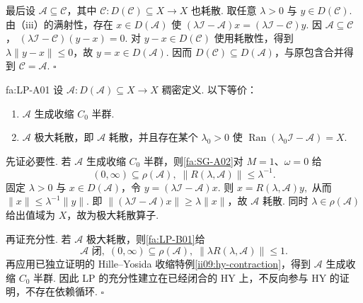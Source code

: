 \begin{FAProof}
最后设 \(\displaystyle\mathcal A\subseteq\mathcal C\)，其中 \(\displaystyle \mathcal C:D(\mathcal C)\subseteq X\to X\)
也耗散. 取任意 \(\displaystyle\lambda>0\) 与 \(\displaystyle y\in D(\mathcal C)\). 由（iii）的满射性，存在 \(\displaystyle x\in D(\mathcal A)\) 使 \(\displaystyle (\lambda\mathcal I-\mathcal A)x = (\lambda\mathcal I-\mathcal C)y.\)
因 \(\displaystyle\mathcal A\subseteq\mathcal C\)， \(\displaystyle (\lambda\mathcal I-\mathcal C)(y-x)=0.\)
对 \(\displaystyle y-x\in D(\mathcal C)\) 使用耗散性，得到 \(\displaystyle\lambda\|y-x\|\leqslant0\)，故 \(\displaystyle y=x\in D(\mathcal A)\). 因而 \(\displaystyle D(\mathcal C)\subseteq D(\mathcal A)\)，与原包含合并得到 \(\displaystyle\mathcal C=\mathcal A\).
\hfill\(\square\)
\end{FAProof}

\begin{FATheorem}{fa:LP-A01}
设 \(\displaystyle \mathcal A:D(\mathcal A)\subseteq X\to X\)
稠密定义. 以下等价：
\begin{enumerate}[label=\textnormal{(\roman*)}]
\item \(\displaystyle\mathcal A\) 生成收缩 \(\displaystyle C_0\) 半群.
\item \(\displaystyle\mathcal A\) 极大耗散，即 \(\displaystyle\mathcal A\) 耗散，并且存在某个 \(\displaystyle\lambda_0>0\) 使 \(\displaystyle \operatorname{Ran}(\lambda_0\mathcal I-\mathcal A)=X.\)
\end{enumerate}
\end{FATheorem}

\begin{FAProof}
先证必要性. 若 \(\displaystyle\mathcal A\) 生成收缩 \(\displaystyle C_0\) 半群，则\autoref{fa:SG-A02}对 \(\displaystyle M=1\)、\(\displaystyle\omega=0\) 给
\[
(0,\infty)\subseteq\rho(\mathcal A),
\;
\|R(\lambda,\mathcal A)\|
\leqslant
\lambda^{-1}.
\]
固定 \(\displaystyle\lambda>0\) 与 \(\displaystyle x\in D(\mathcal A)\)，令 \(\displaystyle y=(\lambda\mathcal I-\mathcal A)x\). 则 \(\displaystyle x=R(\lambda,\mathcal A)y,\)
从而 \(\displaystyle \|x\| \leqslant \lambda^{-1}\|y\|.\)
即 \(\displaystyle\|(\lambda\mathcal I-\mathcal A)x\|\geqslant\lambda\|x\|\)，故 \(\displaystyle\mathcal A\) 耗散. 同时 \(\displaystyle\lambda\in\rho(\mathcal A)\) 给出值域为 \(\displaystyle X\)，故为极大耗散算子.

再证充分性. 若 \(\displaystyle\mathcal A\) 极大耗散，则\autoref{fa:LP-B01}给
\[
\mathcal A\text{ 闭},
\;
(0,\infty)\subseteq\rho(\mathcal A),
\;
\|\lambda R(\lambda,\mathcal A)\|
\leqslant1.
\]
再应用已独立证明的 Hille--Yosida 收缩特例\autoref{ii09:hy-contraction}，得到 \(\displaystyle\mathcal A\) 生成收缩 \(\displaystyle C_0\) 半群. 因此 LP 的充分性建立在已经闭合的 HY 上，不反向参与 HY 的证明，不存在依赖循环.
\hfill\(\square\)
\end{FAProof}

